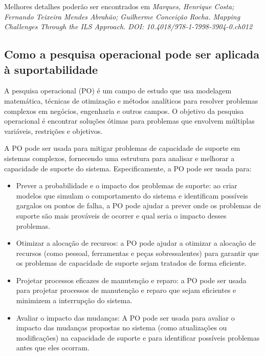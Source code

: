 \documentclass{article}
\begin{document}
Melhores detalhes poderão ser encontrados em {\it Marques, Henrique Costa; Fernando Teixeira Mendes Abrahão; Guilherme Conceição Rocha. Mapping Challenges Through the ILS Approach. DOI: 10.4018/978-1-7998-3904-0.ch012}

\subsection{Como a pesquisa operacional pode ser aplicada à suportabilidade}

A pesquisa operacional (PO) é um campo de estudo que usa modelagem matemática, técnicas de otimização e métodos analíticos para resolver problemas complexos em negócios, engenharia e outros campos. O objetivo da pesquisa operacional é encontrar soluções ótimas para problemas que envolvem múltiplas variáveis, restrições e objetivos.

A PO pode ser usada para mitigar problemas de capacidade de suporte em sistemas complexos, fornecendo uma estrutura para analisar e melhorar a capacidade de suporte do sistema. Especificamente, a PO pode ser usada para:

\begin{itemize}
	
\item Prever a probabilidade e o impacto dos problemas de suporte: ao criar modelos que simulam o comportamento do sistema e identificam possíveis gargalos ou pontos de falha, a PO pode ajudar a prever onde os problemas de suporte são mais prováveis de ocorrer e qual seria o impacto desses problemas.

\item Otimizar a alocação de recursos: a PO pode ajudar a otimizar a alocação de recursos (como pessoal, ferramentas e peças sobressalentes) para garantir que os problemas de capacidade de suporte sejam tratados de forma eficiente.

\item Projetar processos eficazes de manutenção e reparo: a PO pode ser usada para projetar processos de manutenção e reparo que sejam eficientes e minimizem a interrupção do sistema.

\item Avaliar o impacto das mudanças: A PO pode ser usada para avaliar o impacto das mudanças propostas no sistema (como atualizações ou modificações) na capacidade de suporte e para identificar possíveis problemas antes que eles ocorram.

\end{itemize}
\end{document}
